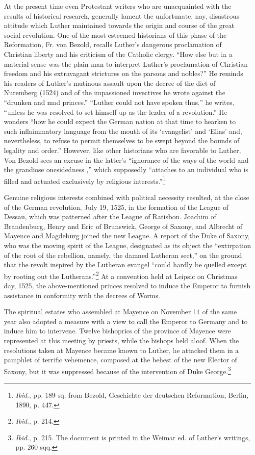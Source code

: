 At the present time even Protestant writers who are unacquainted with the
results of historical research, generally lament the unfortunate, nay,
disastrous attitude which Luther maintained towards the origin and course
of the great social revolution. One of the most esteemed historians of this
phase of the Reformation, Fr. von Bezold, recalls Luther’s dangerous proclamation
of Christian liberty and his criticism of the Catholic clergy. “How
else but in a material sense was the plain man to interpret Luther’s proclamation
of Christian freedom and his extravagant strictures on the parsons and
nobles?” He reminds his readers of Luther’s mutinous assault upon the decree
of the diet of Nuremberg (1524) and of the impassioned invectives he
wrote against the “drunken and mad princes.” “Luther could not have
spoken thus,” he writes, “unless he was resolved to set himself up as the
lezder of a revolution.” He wonders “how he could expect the German
nation at that time to hearken to such inflaimmatory language from the
mouth of its ‘evangelist’ and ‘Elias’ and, nevertheless, to refuse to permit
themselves to be swept beyond the bounds of legality and order.” However,
like other historians who are favorable to Luther, Von Bezold sees an excuse
in the latter’s “ignorance of the ways of the world and the grandiose onesidedness
,” which supposedly “attaches to an individual who is filled and
actuated exclusively by religious interests.”\footnote
{\textit{Ibid.}, pp. 189 sq. from Bezold, Geschichte der deutschen Reformation, Berlin, 1890,
p. 447.}

Genuine religious interests combined with political necessity resulted,
at the close of the German revolution, July 19, 1525, in the
formation of the League of Dessau, which was patterned after the
League of Ratisbon. Joachim of Brandenburg, Henry and Eric of
Brunswick, George of Saxony, and Albrecht of Mayence and Magdeburg
joined the new League. A report of the Duke of Saxony, who
was the moving spirit of the League, designated as its object the
“extirpation of the root of the rebellion, namely, the damned
Lutheran sect,” on the ground that the revolt inspired by the Lutheran
evangel “could hardly be quelled except by rooting out the
Lutherans.”\footnote{\textit{Ibid.}, p. 214.}
At a convention held at Leipsic on Christmas day,
1525, the above-mentioned princes resolved to induce the Emperor
to furnish assistance in conformity with the decrees of Worms.

The spiritual estates who assembled at Mayence on November 14
of the same year also adopted a measure with a view to call the Emperor
to Germany and to induce him to intervene. Twelve bishoprics
of the province of Mayence were represented at this meeting by
priests, while the bishops held aloof. When the resolutions taken at
Mayence became known to Luther, he attacked them in a pamphlet of
terrific vehemence, composed at the behest of the new Elector of
Saxony, but it was suppressed because of the intervention of Duke
George.\footnote
{\textit{Ibid.}, p. 215. The document is printed in the Weimar ed. of Luther’s writings, pp.
260 sqq.}

